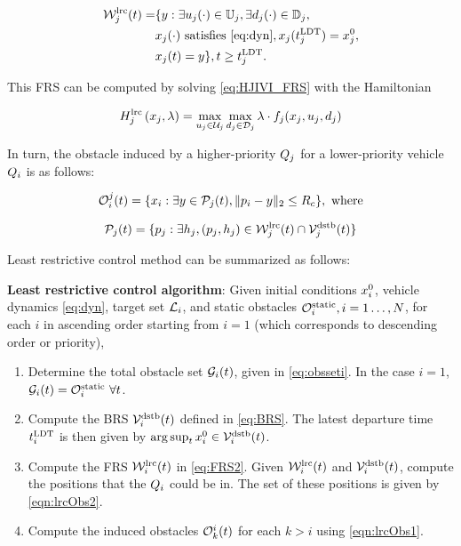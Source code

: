 \begin{equation}
\label{eq:FRS2}
\begin{aligned}
\frs_j^\text{lrc}(t) = & \{y: \exists \ctrl_j(\cdot)\in\cfset_j, \exists \dstb_j(\cdot) \in \dfset_j, \\
& \state_j(\cdot) \text{ satisfies \eqref{eq:dyn}}, \state_j(\ldt_j) = \state_{j}^0,\\
& \state_j(t) = y\}, t \geq \ldt_j.
\end{aligned}
\end{equation}

This FRS can be computed by solving \eqref{eq:HJIVI_FRS} with the Hamiltonian

\begin{equation}
H_j^\text{lrc}\left(x_j, \lambda\right) = \max_{u_j \in \mathcal{U}_j} \max_{d_j \in \mathcal{D}_j} \lambda \cdot f_j(x_j, u_j, d_j)
\end{equation}

In turn, the obstacle induced by a higher-priority $Q_j$ for a lower-priority vehicle $Q_i$ is as follows:

\begin{equation}
\label{eqn:lrcObs1}
\ioset_i^j(t) = \{\state_i: \exists y \in \pfrs_j(t), \|\pos_i - y\|_2 \le \rc \}, \text{ where}
\end{equation}

\begin{equation}
\label{eqn:lrcObs2}
\pfrs_j(t) = \{p_j: \exists \npos_j, (p_j, \npos_j) \in \frs_j^\text{lrc}(t) \cap \brs_j^\text{dstb}(t) \} 
\end{equation}

Least restrictive control method can be summarized as follows:
\begin{alg}
\label{alg:lrc}
\textbf{Least restrictive control algorithm}: Given initial conditions $x_i^0$, vehicle dynamics \eqref{eq:dyn}, target set $\mathcal{L}_i$, and static obstacles $\mathcal{O}^\text{static}_i, i = 1\ldots, N$, for each $i$ in ascending order starting from $i=1$ (which corresponds to descending order or priority),
\begin{enumerate}
\item Determine the total obstacle set $\mathcal{G}_i(t)$, given in \eqref{eq:obsseti}. In the case $i=1$, $\mathcal{G}_i(t) = \mathcal{O}^\text{static}_i ~ \forall t$.
\item Compute the BRS $\mathcal{V}_i^\text{dstb}(t)$ defined in \eqref{eq:BRS}. The latest departure time $t^\text{LDT}_i$ is then given by $\arg \sup_t x_{i}^0 \in \mathcal{V}_i^\text{dstb}(t)$.
\item Compute the FRS $\mathcal{W}_i^\text{lrc}(t)$ in \eqref{eq:FRS2}. Given $\mathcal{W}_i^\text{lrc}(t)$ and $\mathcal{V}_i^\text{dstb}(t)$, compute the positions that the $Q_i$ could be in. The set of these positions is given by \eqref{eqn:lrcObs2}.
\item Compute the induced obstacles $\mathcal{O}_k^i(t)$ for each $k>i$ using \eqref{eqn:lrcObs1}.
\end{enumerate}
\end{alg}

